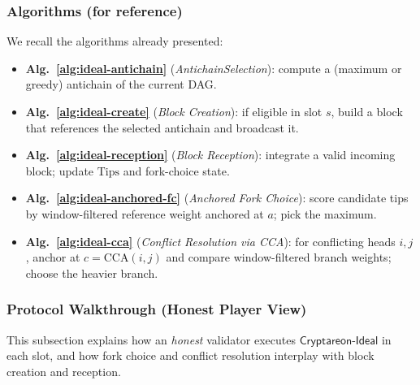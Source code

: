 \documentclass[11pt]{article}
\newcommand{\ProjIdeal}{\ensuremath{\mathsf{Cryptareon\text{-}Ideal}}\xspace}
\newcommand{\Tips}{\ensuremath{\mathrm{Tips}}\xspace}
\newcommand{\CCA}{\ensuremath{\mathrm{CCA}}\xspace}
\begin{document}
\subsubsection{Algorithms (for reference)}
We recall the algorithms already presented:
\begin{itemize}
  \item \textbf{Alg.~\ref{alg:ideal-antichain}} (\emph{AntichainSelection}): compute a (maximum or greedy) antichain of the current DAG.
  \item \textbf{Alg.~\ref{alg:ideal-create}} (\emph{Block Creation}): if eligible in slot $s$, build a block that references the selected antichain and broadcast it.
  \item \textbf{Alg.~\ref{alg:ideal-reception}} (\emph{Block Reception}): integrate a valid incoming block; update $\Tips$ and fork-choice state.
  \item \textbf{Alg.~\ref{alg:ideal-anchored-fc}} (\emph{Anchored Fork Choice}): score candidate tips by window-filtered reference weight anchored at $a$; pick the maximum.
  \item \textbf{Alg.~\ref{alg:ideal-cca}} (\emph{Conflict Resolution via CCA}): for conflicting heads $i,j$, anchor at $c=\CCA(i,j)$ and compare window-filtered branch weights; choose the heavier branch.
\end{itemize}

\subsubsection{Protocol Walkthrough (Honest Player View)}
\label{subsec:ideal-walkthrough}
This subsection explains how an \emph{honest} validator executes \ProjIdeal in each slot, and how fork choice and conflict resolution interplay with block creation and reception.
\end{document}
